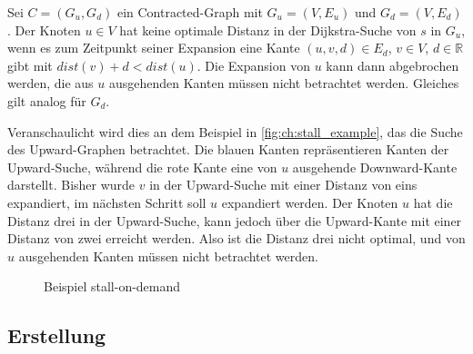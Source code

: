 \begin{definition}
  Sei $C = (G_u, G_d)$ ein Contracted-Graph mit $G_u = (V, E_u)$ und $G_d = (V, E_d)$.
  Der Knoten $u \in V$ hat keine optimale Distanz in der Dijkstra-Suche von $s$ in $G_u$, wenn es zum Zeitpunkt seiner Expansion eine Kante $(u, v, d) \in E_d$, $v \in V$, $d \in \mathbb{R}$ gibt mit ${dist}(v) + d < {dist}(u)$.
  Die Expansion von $u$ kann dann abgebrochen werden, die aus $u$ ausgehenden Kanten müssen nicht betrachtet werden.
  Gleiches gilt analog für $G_d$.
\end{definition}

Veranschaulicht wird dies an dem Beispiel in \autoref{fig:ch:stall_example}, das die Suche des Upward-Graphen betrachtet.
Die blauen Kanten repräsentieren Kanten der Upward-Suche, während die rote Kante eine von $u$ ausgehende Downward-Kante darstellt.
Bisher wurde $v$ in der Upward-Suche mit einer Distanz von eins expandiert, im nächsten Schritt soll $u$ expandiert werden.
Der Knoten $u$ hat die Distanz drei in der Upward-Suche, kann jedoch über die Upward-Kante mit einer Distanz von zwei erreicht werden.
Also ist die Distanz drei nicht optimal, und von $u$ ausgehenden Kanten müssen nicht betrachtet werden.

\begin{figure}
  \centering
  \caption{Beispiel stall-on-demand}
  \label{fig:ch:stall_example}
\end{figure}

\subsection{Erstellung}

